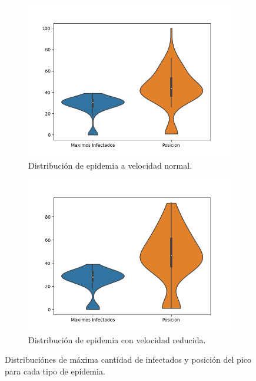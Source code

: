 \documentclass{article}
\begin{document}
\begin{figure}[h]
     \begin{subfigure}[b]{0.49\textwidth}
         \centering
         \includegraphics[width=\textwidth]{Fast_Epidemic.png}
         \caption{Distribuci\'on de epidemia a velocidad normal.}
         \label{fast}
     \end{subfigure}
     \begin{subfigure}[b]{0.49\textwidth}
         \centering
         \includegraphics[width=\textwidth]{Slow_Epidemic.png}
         \caption{Distribuci\'on de epidemia con velocidad reducida.}
         \label{slow}
     \end{subfigure}
     \caption{Distribuci\'ones de m\'axima cantidad de infectados y posici\'on del pico para cada tipo de epidemia.}
     \label{epidemias}
\end{figure}
\end{document}
